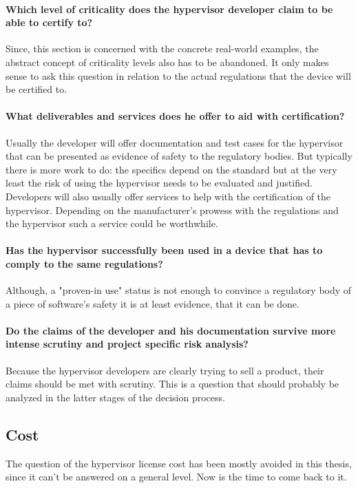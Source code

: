 \paragraph{Which level of criticality does the hypervisor developer claim to be able to certify to?}
Since, this section is concerned with the concrete real-world examples, the abstract concept of criticality levels also has to be abandoned. It only makes sense to ask this question in relation to the actual regulations that the device will be certified to.

\paragraph{What deliverables and services does he offer to aid with certification?}
Usually the developer will offer documentation and test cases for the hypervisor that can be presented as evidence of safety to the regulatory bodies. But typically there is more work to do: the specifics depend on the standard but at the very least the risk of using the hypervisor needs to be evaluated and justified. Developers will also usually offer services to help with the certification of the hypervisor. Depending on the manufacturer's prowess with the regulations and the hypervisor such a service could be worthwhile.
\paragraph{Has the hypervisor successfully been used in a device that has to comply to the same regulations?}
Although, a "proven-in use" status is not enough to convince a regulatory body of a piece of software's safety it is at least evidence, that it can be done.
\paragraph{Do the claims of the developer and his documentation survive more intense scrutiny and project specific risk analysis?}
Because the hypervisor developers are clearly trying to sell a product, their claims should be met with scrutiny. This is a question that should probably be analyzed in the latter stages of the decision process.
\subsection{Cost}
The question of the hypervisor license cost has been mostly avoided in this thesis, since it can't be answered on a general level. Now is the time to come back to it.
